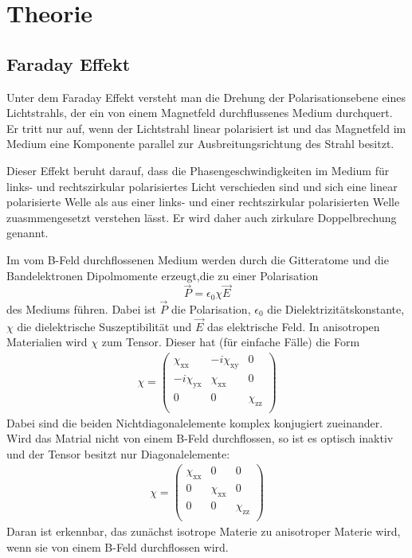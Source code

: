\section{Theorie}
\label{sec:Theorie}

\subsection{Faraday Effekt}
\label{subsec:faraday}
Unter dem Faraday Effekt versteht man die Drehung der Polarisationsebene eines
Lichtstrahls, der ein von einem Magnetfeld durchflussenes Medium durchquert.
Er tritt nur auf, wenn der Lichtstrahl linear polarisiert ist und das Magnetfeld
im Medium eine Komponente parallel zur Ausbreitungsrichtung des Strahl besitzt.

Dieser Effekt beruht darauf, dass die Phasengeschwindigkeiten im Medium für links- und
rechtszirkular polarisiertes Licht verschieden sind und sich eine linear polarisierte
Welle als aus einer links- und einer rechtszirkular polarisierten Welle zuasmmengesetzt
verstehen lässt. Er wird daher auch zirkulare Doppelbrechung genannt.

Im vom B-Feld durchflossenen Medium werden durch die Gitteratome und die Bandelektronen
Dipolmomente erzeugt,die zu einer Polarisation
\begin{equation}
  \vec{P} = \epsilon_0 \chi \vec{E}
  \label{eqn:polarisation}
\end{equation}
des Mediums führen. Dabei ist $\vec{P}$ die Polarisation, $\epsilon_0$ die
Dielektrizitätskonstante, $\chi$ die dielektrische Suszeptibilität und
$\vec{E}$ das elektrische Feld. In anisotropen Materialien wird $\chi$ zum Tensor.
Dieser hat (für einfache Fälle) die Form
\begin{align}
  \chi =
  \left( \begin{matrix}
         \chi_{\mathrm{xx}} & -i \chi_{\mathrm{xy}} & 0 \\
         -i \chi_{\mathrm{yx}} & \chi_{\mathrm{xx}} & 0 \\
         0 & 0 & \chi_{\mathrm{zz}}  \\
  \end{matrix} \right)
  \label{eqn:chitensor}
\end{align}
Dabei sind die beiden Nichtdiagonalelemente komplex konjugiert zueinander. Wird das
Matrial nicht von einem B-Feld durchflossen, so ist es optisch inaktiv und der
Tensor besitzt nur Diagonalelemente:
\begin{align}
  \chi =
  \left( \begin{matrix}
         \chi_{\mathrm{xx}} & 0 & 0 \\
         0 & \chi_{\mathrm{xx}} & 0 \\
         0 & 0 & \chi_{\mathrm{zz}}  \\
  \end{matrix} \right)
  \label{eqn:chitensor2}
\end{align}
Daran ist erkennbar, das zunächst isotrope Materie zu anisotroper Materie wird,
wenn sie von einem B-Feld durchflossen wird.

